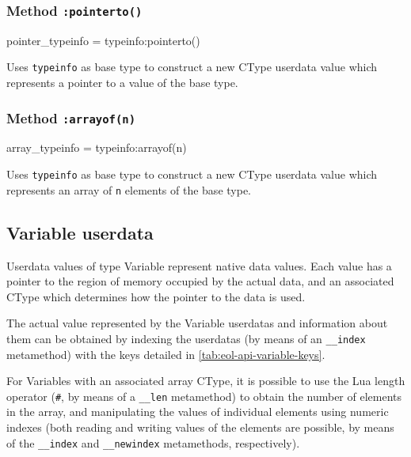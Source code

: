 \subsubsection{Method \texttt{:pointerto()}}

\begin{luacode}
pointer_typeinfo = typeinfo:pointerto()
\end{luacode}

Uses \texttt{typeinfo} as base type to construct a new \textsf{CType} userdata
value which represents a pointer to a value of the base type.


\subsubsection{Method \texttt{:arrayof(n)}}

\begin{luacode}
array_typeinfo = typeinfo:arrayof(n)
\end{luacode}

Uses \texttt{typeinfo} as base type to construct a new \textsf{CType} userdata
value which represents an array of \texttt{n} elements of the base type.


\subsection{Variable userdata}
	\label{sec:eol-api-variable-t}

Userdata values of type \textsf{Variable} represent native data values. Each
value has a pointer to the region of memory occupied by the actual data, and
an associated \textsf{CType} which determines how the pointer to the data is
used.

The actual value represented by the \textsf{Variable} userdatas and information
about them can be obtained by indexing the userdatas (by means of an
\texttt{\_\_index} metamethod) with the keys detailed in
\autoref{tab:eol-api-variable-keys}.

For \textsf{Variable}s with an associated array \textsf{CType}, it is possible
to use the Lua length operator (\texttt\#, by means of a \texttt{\_\_len}
metamethod) to obtain the number of elements in the array, and manipulating
the values of individual elements using numeric indexes (both reading and
writing values of the elements are possible, by means of the
\texttt{\_\_index} and \texttt{\_\_newindex} metamethods, respectively).

